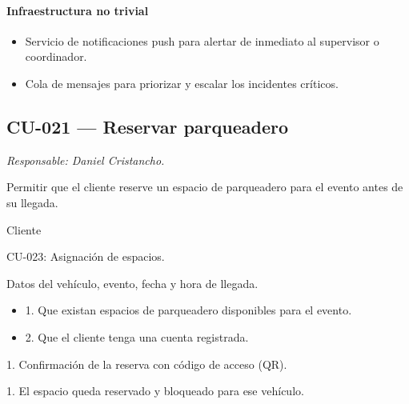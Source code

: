 \paragraph{Infraestructura no trivial}
\begin{itemize}[leftmargin=1.4em, topsep=1pt]
  \item Servicio de notificaciones push para alertar de inmediato al supervisor o coordinador.
  \item Cola de mensajes para priorizar y escalar los incidentes críticos.
\end{itemize}

\subsection{CU-021 --- Reservar parqueadero}
\label{cu:cu-021}
\textit{Responsable: Daniel Cristancho.}

\begin{description}[leftmargin=!, labelwidth=3.4cm, style=nextline, topsep=3pt]
\item[Objetivo] Permitir que el cliente reserve un espacio de parqueadero para el evento antes de su llegada.

\item[Actores] Cliente

\item[CU relacionados] CU-023: Asignación de espacios.

\item[Entradas] Datos del vehículo, evento, fecha y hora de llegada.

\item[Pre-condiciones] \hfill
\begin{itemize}[leftmargin=1.2em, topsep=1pt]
  \item 1. Que existan espacios de parqueadero disponibles para el evento.
  \item 2. Que el cliente tenga una cuenta registrada.
\end{itemize}

\item[Salidas] 1. Confirmación de la reserva con código de acceso (QR).

\item[Post-condiciones] 1. El espacio queda reservado y bloqueado para ese vehículo.

\end{description}

